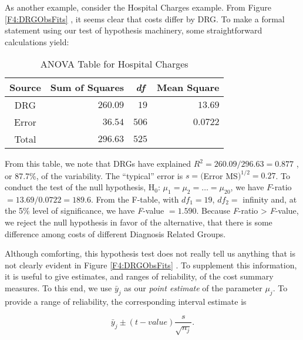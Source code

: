 As another example, consider the Hospital Charges example. From
Figure \ref{F4:DRGObsFits} , it seems clear that costs differ by
DRG. To make a formal statement using our test of hypothesis
machinery, some straightforward calculations yield:

  \begin{center}  \begin{table}[h]
\caption{\label{T4:HospChgANOVA} ANOVA Table for Hospital Charges}
\begin{tabular}{cccc}
\hline
Source & Sum of Squares & \textit{df} & Mean Square \\ \hline
DRG & \multicolumn{1}{r}{$260.09$} & \multicolumn{1}{r}{$19$} &
\multicolumn{1}{r}{$13.69$} \\
Error & \multicolumn{1}{r}{$36.54$} & \multicolumn{1}{r}{$506$} &
\multicolumn{1}{r}{$0.0722$} \\
Total & \multicolumn{1}{r}{$296.63$} & \multicolumn{1}{r}{$525$} &
\multicolumn{1}{r}{} \\ \hline
\end{tabular}

\end{table}  \end{center}  

\noindent From this table, we note that DRGs have explained $R^{2}=260.09/296.63=0.877$%
, or 87.7\%, of the variability. The ``typical'' error is $s=($Error MS$%
)^{1/2}=0.27$. To conduct the test of the null hypothesis, H$_{0}$: $\mu
_{1}=\mu _{2}=\ldots =\mu _{20}$, we have $F$-ratio $=13.69/0.0722=189.6$.
From the F-table, with $df_{1}=19$, $df_{2}=$ infinity and, at the 5\% level
of significance, we have \textit{F}-value $=1.590$. Because \textit{F}-ratio
> \textit{F}-value, we reject the null hypothesis in favor of
the alternative, that there is some difference among costs of different
Diagnosis Related Groups.

Although comforting, this hypothesis test does not really tell us
anything that is not clearly evident in Figure \ref{F4:DRGObsFits} .
To supplement this information, it is useful to give estimates, and
ranges of reliability, of the cost summary measures. To this end, we
use $\bar{y}_{j}$ as our \textit{point estimate} of the parameter
$\mu _{j}$. To provide a range of reliability, the corresponding
interval estimate is

\begin{equation*}
\bar{y}_{j}\pm (t-value)\frac{s}{\sqrt{n_{j}}}.
\end{equation*}

